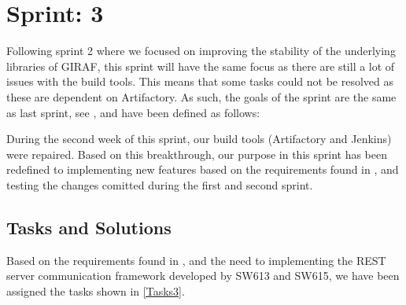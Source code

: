 \chapter{Sprint: 3}
Following sprint 2 where we focused on improving the stability of the underlying
libraries of GIRAF, this sprint will have the same focus as there are still a
lot of issues with the build tools. This means that some tasks could not be
resolved as these are dependent on Artifactory. As such, the goals of the sprint
are the same as last sprint, see \label{Sprint2UserStories}, and have been
defined as follows:\nl

\nl

\nl

\nl

During the second week of this sprint, our build tools (Artifactory and
Jenkins) were repaired. Based on this breakthrough, our purpose in this sprint
has been redefined to implementing new features based on the requirements found
in \label{sec:Colab2}, and testing the changes comitted during the first and
second sprint. 

\section{Tasks and Solutions}
Based on the requirements found in \label{sec:Colab2}, and the need to
implementing the REST server communication framework developed by SW613 and
SW615, we have been assigned the tasks shown in \autoref{Tasks3}.


